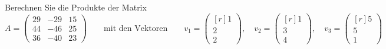 Berechnen Sie die Produkte der Matrix
%
%
%
%
%
%
%
\[
A
=
\begin{pmatrix*}
29&-29&15\\
44&-46&25\\
36&-40&23
\end{pmatrix*}
\qquad\text{mit den Vektoren}\qquad
v_1
=
\begin{pmatrix*}[r]
1\\2\\2
\end{pmatrix*},
\quad
v_2
=
\begin{pmatrix*}[r]
1\\3\\4
\end{pmatrix*},
\quad
v_3
=
\begin{pmatrix*}[r]
5\\5\\1
\end{pmatrix*}
\]


